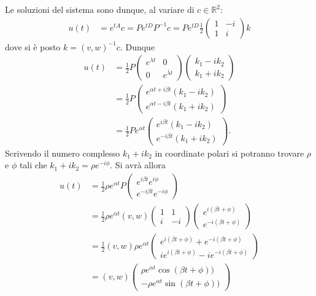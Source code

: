 \documentclass[italian,a4paper]{scrartcl}
\newcommand{\RR}{{\mathbb R}}
\begin{document}
Le soluzioni del sistema sono dunque, al variare di $c\in \RR^2$:
\begin{align*}
u(t) & = e^{tA} c = P e^{tD}P^{-1} c
       = P e^{tD} \frac 1 2 \begin{pmatrix}1 & -i\\ 1 & i\end{pmatrix} k
\end{align*}
dove si è posto $k=(v,w)^{-1} c$. Dunque
\begin{align*}
  u(t) &= \frac 1 2 P \begin{pmatrix}e^{\lambda t} & 0 \\ 0 & e^{\bar \lambda t}\end{pmatrix}
          \begin{pmatrix}k_1 - ik_2\\ k_1 + i k_2\end{pmatrix}\\
 &= \frac 1 2 P \begin{pmatrix}e^{\alpha t + i \beta t}(k_1-ik_2) \\ e^{\alpha t - i \beta t}(k_1 + i k_2)\end{pmatrix} \\
 &= \frac 1 2 P e^{\alpha t}\begin{pmatrix} e^{i\beta t}(k_1-ik_2) \\
  e^{-i\beta t}(k_1 + ik_2)\end{pmatrix}.
\end{align*}
Scrivendo il numero complesso $k_1 + i k_2$ in coordinate polari si potranno trovare $\rho$ e $\phi$ tali
che $k_1 + i k_2 = \rho e^{-i\phi}$. Si avrà allora
\begin{align*}
u(t)
&=
\frac 1 2 \rho e^{\alpha t}P\begin{pmatrix}
e^{i\beta t} e^{i\phi} \\
e^{-i\beta t} e^{-i\phi}
\end{pmatrix}\\
&=
\frac 1 2 \rho e^{\alpha t} (v,w)
\begin{pmatrix}1 & 1 \\ i & -i\end{pmatrix}
\begin{pmatrix}
e^{i(\beta t+\phi)} \\
e^{-i(\beta t+\phi)}
\end{pmatrix}\\
& =
\frac 1 2 (v,w) \rho e^{\alpha t}
\begin{pmatrix}
e^{i(\beta t+\phi)} + e^{-i(\beta t+\phi)}\\
ie^{i(\beta t+\phi)} - ie^{-i(\beta t+\phi)}
\end{pmatrix}\\
&=
(v,w)
\begin{pmatrix}
\rho e^{\alpha t}
\cos(\beta t+\phi))\\
-\rho e^{\alpha t}
\sin(\beta t+\phi))
\end{pmatrix}
\end{align*}
\end{document}
